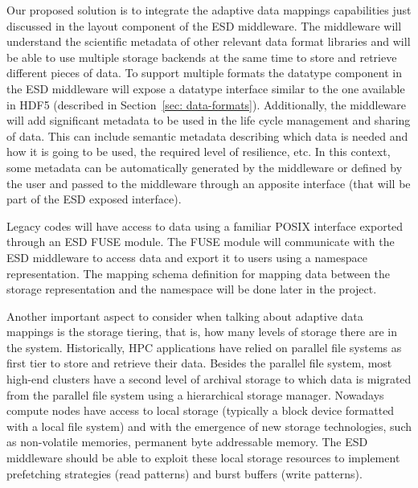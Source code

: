 \documentclass{../../template/esiwace-report}
\begin{document}
Our proposed solution is to integrate the adaptive data mappings capabilities just discussed in the layout component of the ESD middleware. The middleware will understand the scientific metadata of other relevant data format libraries and will be able to use multiple storage backends at the same time to store and retrieve different pieces of data. To support multiple formats the datatype component in the ESD middleware will expose a datatype interface similar to the one available in HDF5 (described in Section~\ref{sec: data-formats}). Additionally, the middleware will add significant metadata to be used in the life cycle management and sharing of data. This can include semantic metadata describing which data is needed and how it is going to be used, the required level of resilience, etc. In this context, some metadata can be automatically generated by the middleware or defined by the user and passed to the middleware through an apposite interface (that will be part of the ESD exposed interface).

Legacy codes will have access to data using a familiar POSIX interface exported through an ESD FUSE module. The FUSE module will communicate with the ESD middleware to access data and export it to users using a namespace representation. The mapping schema definition for mapping data between the storage representation and the namespace will be done later in the project.

Another important aspect to consider when talking about adaptive data mappings is the storage tiering, that is, how many levels of storage there are in the system. Historically, HPC applications have relied on parallel file systems as first tier to store and retrieve their data. Besides the parallel file system, most high-end clusters have a second level of archival storage to which data is migrated from the parallel file system using a hierarchical storage manager. Nowadays compute nodes have access to local storage (typically a block device formatted with a local file system) and with the emergence of new storage technologies, such as non-volatile memories, permanent byte addressable memory. The ESD middleware should be able to exploit these local storage resources to implement prefetching strategies (read patterns) and burst buffers (write patterns).
\end{document}
